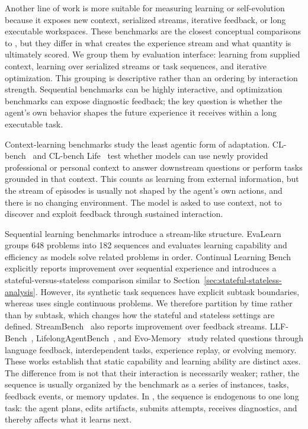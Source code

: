 Another line of work is more suitable for measuring learning or self-evolution because it exposes new context, serialized streams, iterative feedback, or long executable workspaces. These benchmarks are the closest conceptual comparisons to \benchmark{}, but they differ in what creates the experience stream and what quantity is ultimately scored. We group them by evaluation interface: learning from supplied context, learning over serialized streams or task sequences, and iterative optimization. This grouping is descriptive rather than an ordering by interaction strength. Sequential benchmarks can be highly interactive, and optimization benchmarks can expose diagnostic feedback; the key question is whether the agent's own behavior shapes the future experience it receives within a long executable task.

Context-learning benchmarks study the least agentic form of adaptation. CL-bench~\cite{dou2026clbench} and CL-bench Life~\cite{dou2026clbenchlife} test whether models can use newly provided professional or personal context to answer downstream questions or perform tasks grounded in that context. This counts as learning from external information, but the stream of episodes is usually not shaped by the agent's own actions, and there is no changing environment. The model is asked to use context, not to discover and exploit feedback through sustained interaction.

Sequential learning benchmarks introduce a stream-like structure. EvaLearn~\cite{dou2025evalearn} groups 648 problems into 182 sequences and evaluates learning capability and efficiency as models solve related problems in order. Continual Learning Bench~\cite{asawa2026clbench} explicitly reports improvement over sequential experience and introduces a stateful-versus-stateless comparison similar to Section~\ref{sec:stateful-stateless-analysis}. However, its synthetic task sequences have explicit subtask boundaries, whereas \benchmark{} uses single continuous problems. We therefore partition by time rather than by subtask, which changes how the stateful and stateless settings are defined. StreamBench~\cite{wu2024streambench} also reports improvement over feedback streams. LLF-Bench~\cite{cheng2023llfbench}, LifelongAgentBench~\cite{zheng2025lifelongagentbench}, and Evo-Memory~\cite{wei2025evomemory} study related questions through language feedback, interdependent tasks, experience replay, or evolving memory. These works establish that static capability and learning ability are distinct axes. The difference from \benchmark{} is not that their interaction is necessarily weaker; rather, the sequence is usually organized by the benchmark as a series of instances, tasks, feedback events, or memory updates. In \benchmark{}, the sequence is endogenous to one long task: the agent plans, edits artifacts, submits attempts, receives diagnostics, and thereby affects what it learns next.

